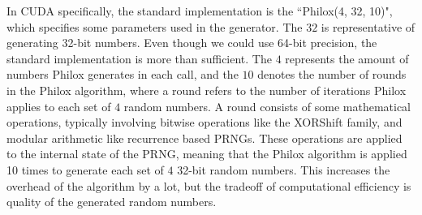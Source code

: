 \documentclass{article}
\begin{document}
In CUDA specifically, the standard implementation is the ``Philox(4, 32, 10)", which specifies some parameters used in the generator. The $32$ is representative of generating 32-bit numbers. Even though we could use 64-bit precision, the standard implementation is more than sufficient. The $4$ represents the amount of numbers Philox generates in each call, and the $10$ denotes the number of rounds in the Philox algorithm, where a round refers to the number of iterations Philox applies to each set of $4$ random numbers. A round consists of some mathematical operations, typically involving bitwise operations like the XORShift family, and modular arithmetic like recurrence based PRNGs. These operations are applied to the internal state of the PRNG, meaning that the Philox algorithm is applied 10 times to generate each set of $4$ 32-bit random numbers. This increases the overhead of the algorithm by a lot, but the tradeoff of computational efficiency is quality of the generated random numbers.
\end{document}
